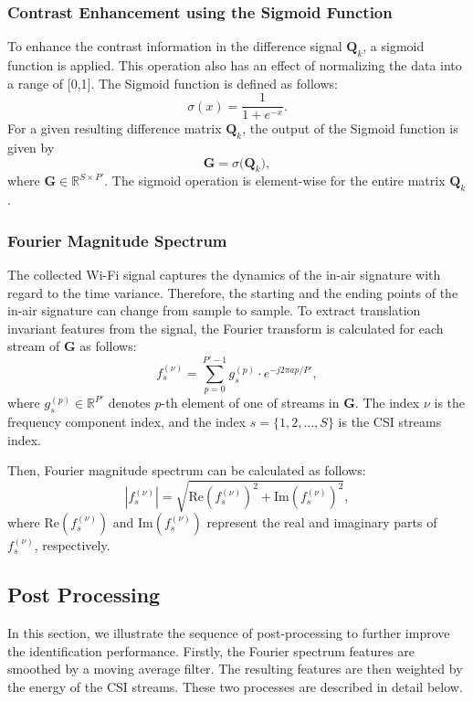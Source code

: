 \subsubsection{Contrast Enhancement using the Sigmoid Function}
To enhance the contrast information in the difference signal $\textbf{Q}_{k}$, a sigmoid function is applied. This operation also has an effect of normalizing the data into a range of [0,1]. The Sigmoid function is defined as follows:
\begin{equation}
\sigma (x) = \frac{1}{1+e^{-x}}.
\end{equation}
For a given resulting difference matrix $\textbf{Q}_{k}$, the output of the Sigmoid function is given by
\begin{equation}
\textbf{G} = \sigma \big(\textbf{Q}_{k}\big),
\end{equation}
where $\textbf{G}\in\mathbb{R}^{S \times P'}$. The sigmoid operation is element-wise for the entire matrix $\textbf{Q}_{k}$.

\subsubsection{Fourier Magnitude Spectrum}
The collected Wi-Fi signal captures the dynamics of the in-air signature with regard to the time variance. Therefore, the starting and the ending points of the in-air signature can change from sample to sample. To extract translation invariant features from the signal, the Fourier transform is calculated for each stream of $\textbf{G}$ as follows:
\begin{equation}
f^{(\nu)}_{s} = \sum_{p=0}^{P'-1} g^{(p)}_{s}\cdot e^{-j2\pi ap/P'},
\end{equation}
where $g^{(p)}_{s}\in\mathbb{R}^{P'}$ denotes $p$-th element of one of streams in $\textbf{G}$. The index $\nu$ is the frequency component index, and the index $s=\{1,2,\hdots,S\}$ is the CSI streams index.

Then, Fourier magnitude spectrum can be calculated as follows:
\begin{equation}
|f^{(\nu)}_{s}| = \sqrt{\textrm{Re}(f^{(\nu)}_{s})^{2}+\textrm{Im}(f^{(\nu)}_{s})^{2}},
\end{equation}
where $\textrm{Re}(f^{(\nu)}_{s})$ and $\textrm{Im}(f^{(\nu)}_{s})$ represent the real and imaginary parts of $f^{(\nu)}_{s}$, respectively.

\subsection{Post Processing}
In this section, we illustrate the sequence of post-processing to further improve the identification performance. Firstly, the Fourier spectrum features are smoothed by a moving average filter. The resulting features are then weighted by the energy of the CSI streams. These two processes are described in detail below.
 
